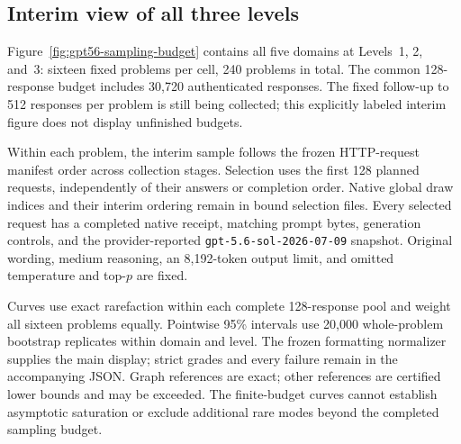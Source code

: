 \subsection{Interim view of all three levels}
\label{app:gpt56-all-levels-interim}

Figure~\ref{fig:gpt56-sampling-budget} contains all five domains at
Levels~1, 2, and~3: sixteen fixed problems per cell, 240 problems in total.
The common 128-response budget includes 30,720 authenticated responses.
The fixed follow-up to 512 responses per problem is still being collected;
this explicitly labeled interim figure does not display unfinished budgets.

Within each problem, the interim sample follows the frozen HTTP-request
manifest order across collection stages. Selection uses the first 128
planned requests, independently of their answers or completion order.
Native global draw indices and their interim ordering remain in bound
selection files. Every selected request has a completed native receipt,
matching prompt bytes, generation controls, and the provider-reported
\texttt{gpt-5.6-sol-2026-07-09} snapshot. Original wording, medium reasoning,
an 8,192-token output limit, and omitted temperature and top-$p$ are fixed.

Curves use exact rarefaction within each complete 128-response pool and
weight all sixteen problems equally. Pointwise 95\% intervals use 20,000
whole-problem bootstrap replicates within domain and level. The frozen
formatting normalizer supplies the main display; strict grades and every
failure remain in the accompanying JSON. Graph references are exact;
other references are certified lower bounds and may be exceeded. The
finite-budget curves cannot establish asymptotic saturation or exclude
additional rare modes beyond the completed sampling budget.
